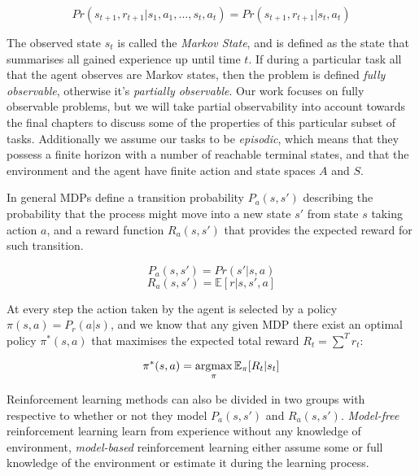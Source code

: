 \begin{equation}
Pr(s_{t+1}, r_{t+1} | s_1, a_1, ... , s_t, a_t) = Pr(s_{t+1}, r_{t+1} |
s_t, a_t)
\label{eq:rl_mdp}
\end{equation}

The observed state $s_t$ is called the \emph{Markov State}, and is defined as
the state that summarises all gained experience up until time $t$. If during a
particular task all that the agent observes are Markov states, then the problem
is defined \emph{fully observable}, otherwise it's \emph{partially observable}.
Our work focuses on fully observable problems, but we will take partial
observability into account towards the final chapters to discuss some of the
properties of this particular subset of tasks. Additionally we assume our tasks
to be \emph{episodic}, which means that they possess a finite horizon with a
number of reachable terminal states, and that the environment and the agent have
finite action and state spaces $A$ and $S$.

In general MDPs define a transition probability $P_a(s, s')$ describing the
probability that the process might move into a new state $s'$ from state $s$
taking action $a$, and a reward function $R_a(s, s')$ that provides the expected
reward for such transition.


\begin{equation}
P_a(s, s') = Pr(s' | s, a)
\end{equation}
\begin{equation}
R_a(s, s') = \mathbb{E}[r|s, s', a]
\end{equation}

At every step the action taken by the agent is selected by a policy $\pi(s, a) =
P_r(a | s)$, and we know that any given MDP there exist an optimal policy
$\pi^*(s, a)$ that maximises the expected total reward $R_t = \sum^T{r_t}$:

\begin{equation}
  \pi^*(s, a) = \operatornamewithlimits{argmax}_{\pi} \mathbb{E}_{\pi}[R_t | s_t]
\end{equation}

Reinforcement learning methods can also be divided in two groups with
respective to whether or not they model $P_a(s, s')$ and $R_a(s, s')$.
\emph{Model-free} reinforcement learning learn from experience without any
knowledge of environment, \emph{model-based} reinforcement learning either
assume some or full knowledge of the environment or estimate it during the
learning process.

